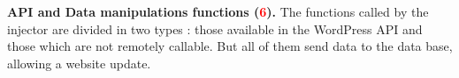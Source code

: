 		\vspace{0.15em}
		\noindent\textbf{API and Data manipulations functions (\textcolor{red}{6}).} The functions called by the injector are divided in two types : those available in the WordPress API and those which are not remotely callable. But all of them send data to the data base, allowing a website update.	
	
	